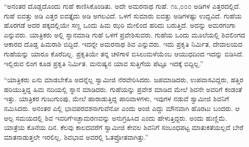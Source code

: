  “ಅನಂತರ ದೊಡ್ಡದೊಂದು ಗುಹೆ ಕಾಣಿಸಿಕೊಂಡಿತು. ಅದೇ ಅಮರನಾಥ ಗುಹೆ. ೧೩,೦೦೦ ಅಡಿಗಳ ಎತ್ತರದಲ್ಲಿದೆ. ಗುಹೆ ಐವತ್ತು ಅಡಿ ಎತ್ತರ ಐವತ್ತೈದು ಅಡಿ ಅಗಲವಿದೆ. ಒಳಗೆ ಸುಮಾರು ಐವತ್ತು ಅಡಿಗಳಷ್ಟು ಉದ್ದವಿದೆ. ಗುಹೆಯ ಹೊರಗಡೆ ಅದರ ಪಕ್ಕದಲ್ಲಿಯೇ ಸಣ್ಣ ಒಂದು ಹಿಮ ಝರಿ ಮೇಲಿಂದ ಹರಿದು ಬರುತ್ತಿದೆ. ಅದನ್ನು ಅಮರಗಂಗಾ ಎನ್ನುವರು. ಯಾತ್ರಿಕರು ಅಲ್ಲಿ ಸ್ನಾನಮಾಡಿ ಗುಹೆ ಒಳಗೆ ಪ್ರವೇಶಿಸುವರು. ಗುಹೆಯ ಒಂದು ಮೂಲೆಯಲ್ಲಿ ಶಿವಲಿಂಗದ ಆಕಾರದ ದೊಡ್ಡ ಹಿಮರಾಶಿ ಬಿದ್ದಿದೆ. ಇದನ್ನೇ ಅಮರನಾಥ ಶಿವ ಎನ್ನುವರು. ಇದು ಪ್ರಕೃತಿ ನಿರ್ಮಿತ, ದೇವಾಲಯದ ಗುಹೆಯನ್ನು ಯಾರೂ ಕೊರೆದಿಲ್ಲ. ಪ್ರಕೃತಿಯೇ ತನ್ನ ಚಳಿಗಾಳಿ ಬಿಸಿಲುಮಳೆಯೆಂಬ ಆಯುಧದಿಂದ ಇದನ್ನು ಬಿಡಿಸಿದೆ. ಇಲ್ಲಿರುವ ಲಿಂಗ ಕೂಡ ಪ್ರಕೃತಿ ನಿರ್ಮಿತ. ಮನುಷ್ಯನ ಯಾವ ಸುತ್ತಿಗೆಯ ಪೆಟ್ಟೂ ಇದಕ್ಕೆ ಬಿದ್ದಿಲ್ಲ.” 

 “ಯಾತ್ರಿಕರು ಏನು ಮಾಡಬೇಕೊ ಅದನ್ನೆಲ್ಲ ಸ್ವಾಮೀಜಿ ನೆರವೇರಿಸಿದರು. ಜಪಮಾಡಿದರು, ಉಪವಾಸವಿದ್ದರು, ಹತ್ತಿರ ಹರಿಯುತ್ತಿದ್ದ ಹಿಮ ನದಿಯಲ್ಲಿ ಸ್ನಾನ ಮಾಡಿದರು. ಗುಹೆಯನ್ನು ಪ್ರವೇಶ ಮಾಡಿದ ಮೇಲೆ ಶಿವನೇ ಅವರಿಗೆ ಕಂಡಂತೆ ಇತ್ತು. ಯಾತ್ರಿಕರ ಗುಜುಗುಂಪು, ಮೇಲೆ ಹಾರಾಡುತ್ತಿದ್ದ ಪಾರಿವಾಳಗಳು, ಇವುಗಳ ನಡುವೆ ಸ್ವಾಮೀಜಿ ಶಿವನಿಗೆ ನಮಿಸಿದರು. ಅನಂತರ ಎಲ್ಲಿ ಭಾವಪರವಶನಾಗುವೆನೋ ಎಂದು ಅಂಜಿ ಎದ್ದು ಮೌನವಾಗಿ ಹೊರಟು ಬಂದರು. ಆ ಅಲ್ಪ ಸಮಯದಲ್ಲಿ ಶಿವ ಇವರಿಗೆ\break ಇಚ್ಛಾಮರಣವನ್ನು ಅನುಗ್ರಹಿಸಿದ ಎಂದು ಹೇಳುತ್ತಿದ್ದರು. ಅಂದು ಹುಣ್ಣಿಮೆ. ಯಾತ್ರೆಯ ಕೊನೆಯ ದಿನ. ಕೆಲವು ಕಾಲದವರೆಗೆ ಸ್ವಾಮೀಜಿ ಕೇವಲ ಶಿವನಿಗೆ ಸಂಬಂಧಪಟ್ಟ ಮಾತುಕತೆಯಲ್ಲದೆ ಬೇರೆ ಮಾತನಾಡುತ್ತಲೇ ಇರಲಿಲ್ಲ, ಶಿವಭಾವ ಅವರಲ್ಲಿ ಓತಪ್ರೋತವಾಗಿತ್ತು.” 

